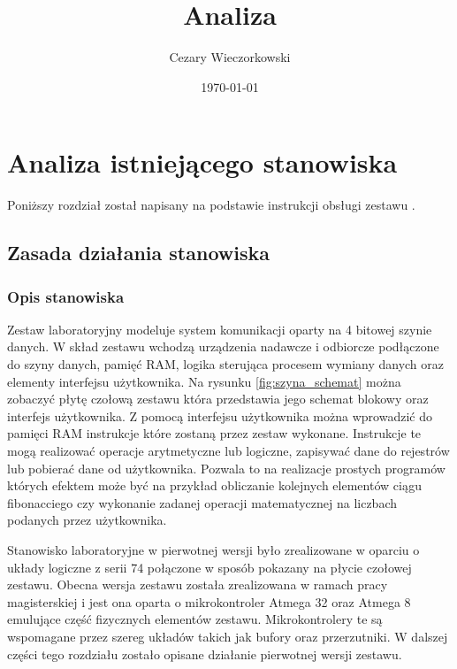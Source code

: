 \documentclass[../main.tex]{subfiles}
\author{Cezary Wieczorkowski}
\date{\today}
\title{Analiza}
\begin{document}
\section{Analiza istniejącego stanowiska}
Poniższy rozdział został napisany na podstawie instrukcji obsługi zestawu \cite{szyna:instrukcja} .   
\subsection{Zasada działania stanowiska}
    
    \subsubsection{Opis stanowiska}
        Zestaw laboratoryjny modeluje system komunikacji oparty na 4 bitowej szynie danych. W skład zestawu wchodzą urządzenia nadawcze i odbiorcze
        podłączone do szyny danych, pamięć RAM, logika sterująca procesem wymiany danych oraz elementy interfejsu użytkownika. 
        Na rysunku \ref{fig:szyna_schemat} można zobaczyć płytę czołową zestawu która przedstawia jego schemat blokowy oraz interfejs użytkownika. 
        Z pomocą interfejsu użytkownika można wprowadzić do pamięci RAM instrukcje które zostaną przez zestaw wykonane. Instrukcje te mogą 
        realizować operacje arytmetyczne lub logiczne, zapisywać dane do rejestrów lub pobierać dane od użytkownika. Pozwala to na realizacje
        prostych programów których efektem może być na przykład obliczanie kolejnych elementów ciągu fibonacciego czy wykonanie
        zadanej operacji matematycznej na liczbach podanych przez użytkownika.
        \par
        Stanowisko laboratoryjne w pierwotnej wersji było zrealizowane w oparciu o układy logiczne z serii 74 połączone w sposób
        pokazany na płycie czołowej zestawu. Obecna wersja zestawu została zrealizowana w ramach pracy magisterskiej \cite{szyna:praca} i jest ona 
        oparta o mikrokontroler Atmega 32 oraz Atmega 8 emulujące część fizycznych elementów zestawu. Mikrokontrolery te są wspomagane przez szereg 
        układów takich jak bufory oraz przerzutniki. W dalszej części tego rozdziału zostało opisane działanie pierwotnej wersji zestawu.
\end{document}
